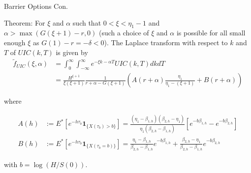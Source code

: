 \documentclass{beamer}
\begin{document}
\begin{frame}{Barrier Options Con.}

    {\footnotesize \footnotesize
    \par Theorem:  For \(\xi\) and \(\alpha\) such that \(0 < \xi < \eta_1 - 1\) and \(\alpha > \max(G(\xi + 1) - r, 0)\) (such a choice of \(\xi\) and \(\alpha\) is possible 
    for all small enough \(\xi\) as \(G(1) - r = -\delta < 0\)). The Laplace transform with respect to \(k\) and \(T\) of \(UIC(k, T)\) is given by
    \begin{align*}
    \tilde{f}_{UIC}(\xi, \alpha) &= \int_{0}^{\infty} \int_{-\infty}^{\infty} e^{-\xi k - \alpha T} UIC(k, T) dk dT \\
    &= \frac{H^{\xi+1}}{\xi (\xi + 1)} \frac{1}{r + \alpha - G(\xi + 1)} \left( A(r + \alpha) \frac{\eta_1}{\eta_1 - (\xi + 1)} + B(r + \alpha) \right)
    \end{align*}
    \par where

    \begin{align*}
    A(h) &:= E^* \left[ e^{-h\tau_b} \mathbf{1}_{\{X(\tau_b) > b\}} \right] =
     \frac{(\eta_1 - \beta_{1,h}) (\beta_{2,h} - \eta_1)}{\eta_1 (\beta_{2,h} - \beta_{1,h})} \left[ e^{-b\beta_{1,h}} - e^{-b\beta_{2,h}} \right]\\
    B(h) &:= E^* \left[ e^{-h\tau_b} \mathbf{1}_{\{X(\tau_b = b)\}} \right] =
    \frac{\eta_1 - \beta_{1,h}}{\beta_{2,h} - \beta_{1,h}} e^{-b\beta_{1,h}} + \frac{\beta_{2,h} - \eta_1}{\beta_{2,h} - \beta_{1,h}} e^{-b\beta_{2,h}}
    \end{align*}
    \par with \(b = \log(H/S(0))\).
    }
    


\end{frame}
\end{document}
